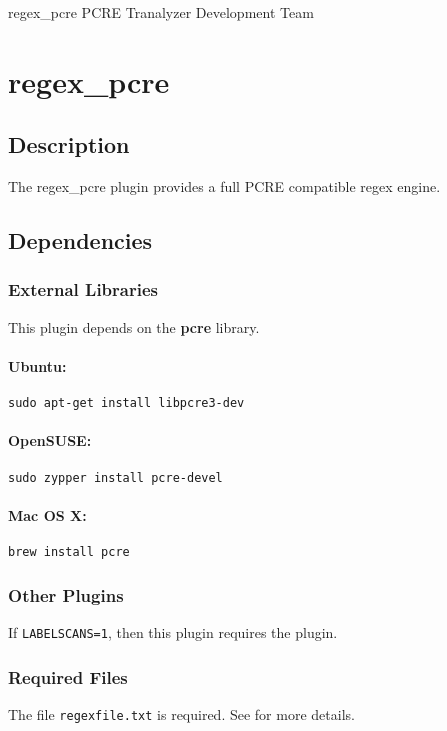 \documentclass[documentation]{subfiles}
\begin{document}
\trantitle
    {regex\_pcre}
    {PCRE}
    {Tranalyzer Development Team}

\section{regex\_pcre}\label{s:regex_pcre}

\subsection{Description}
The regex\_pcre plugin provides a full PCRE compatible regex engine.

\subsection{Dependencies}

\subsubsection{External Libraries}
This plugin depends on the {\bf pcre} library.
\paragraph{Ubuntu:} {\tt sudo apt-get install libpcre3-dev}
\paragraph{OpenSUSE:} {\tt sudo zypper install pcre-devel}
\paragraph{Mac OS X:} {\tt brew install pcre}

\subsubsection{Other Plugins}
If {\tt LABELSCANS=1}, then this plugin requires the  plugin.

\subsubsection{Required Files}
The file {\tt regexfile.txt} is required. See  for more details.
\end{document}
